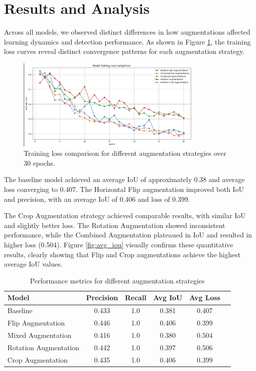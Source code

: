 \documentclass[12pt]{article}
\begin{document}
\section{Results and Analysis}
Across all models, we observed distinct differences in how augmentations affected learning dynamics and detection performance. As shown in Figure \ref{fig:training_loss_comparison}, the training loss curves reveal distinct convergence patterns for each augmentation strategy.

\begin{figure}[H]
    \centering
    \includegraphics[width=0.8\textwidth]{training_loss_comparison.png}
    \caption{Training loss comparison for different augmentation strategies over 30 epochs.}
    \label{fig:training_loss_comparison}
\end{figure}

The baseline model achieved an average IoU of approximately 0.38 and average loss converging to 0.407. The Horizontal Flip augmentation improved both IoU and precision, with an average IoU of 0.406 and loss of 0.399.


The Crop Augmentation strategy achieved comparable results, with similar IoU and slightly better loss. The Rotation Augmentation showed inconsistent performance, while the Combined Augmentation plateaued in IoU and resulted in higher loss (0.504). Figure \ref{fig:avg_iou} visually confirms these quantitative results, clearly showing that Flip and Crop augmentations achieve the highest average IoU values.

\begin{table}[h!]
\centering
\begin{tabular}{lccccc}
\toprule
\textbf{Model} & \textbf{Precision} & \textbf{Recall} & \textbf{Avg IoU} & \textbf{Avg Loss} \\
\midrule
Baseline & 0.433 & 1.0 & 0.381 & 0.407 \\
Flip Augmentation & 0.446 & 1.0 & 0.406 & 0.399 \\
Mixed Augmentation & 0.416 & 1.0 & 0.380 & 0.504 \\
Rotation Augmentation & 0.442 & 1.0 & 0.397 & 0.506 \\
Crop Augmentation & 0.435 & 1.0 & 0.406 & 0.399 \\
\bottomrule
\end{tabular}
\caption{Performance metrics for different augmentation strategies}
\end{table}
\end{document}
